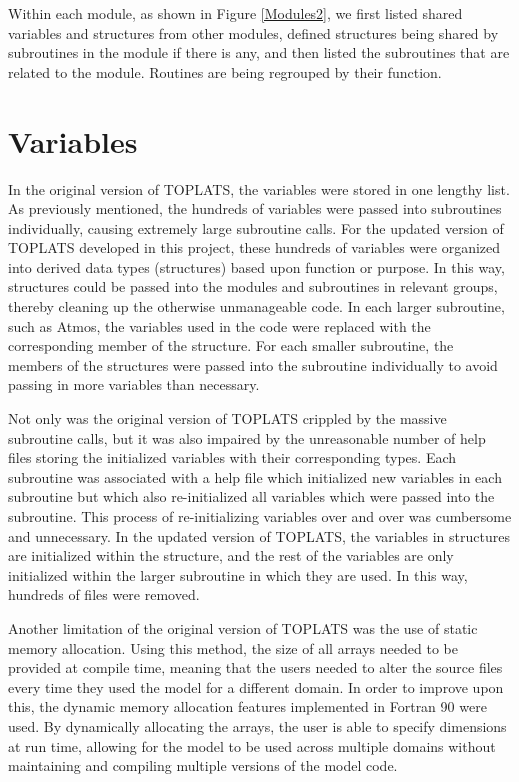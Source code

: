 \documentclass[pdftex,12pt,a4paper]{article}
\begin{document}
Within each module, as shown in Figure \ref{Modules2}, we first listed shared variables and structures from other modules, defined structures being shared by subroutines in the module if there is any, and then listed the subroutines that are related to the module. Routines are being regrouped by their function. 

\section{Variables}
In the original version of TOPLATS, the variables were stored in one lengthy list. As previously mentioned, the hundreds of variables were passed into subroutines individually, causing extremely large subroutine calls. For the updated version of TOPLATS developed in this project, these hundreds of variables were organized into derived data types (structures) based upon function or purpose. In this way, structures could be passed into the modules and subroutines in relevant groups, thereby cleaning up the otherwise unmanageable code. In each larger subroutine, such as Atmos, the variables used in the code were replaced with the corresponding member of the structure. For each smaller subroutine, the members of the structures were passed into the subroutine individually to avoid passing in more variables than necessary.

Not only was the original version of TOPLATS crippled by the massive subroutine calls, but it was also impaired by the unreasonable number of help files storing the initialized variables with their corresponding types. Each subroutine was associated with a help file which initialized new variables in each subroutine but which also re-initialized all variables which were passed into the subroutine. This process of re-initializing variables over and over was cumbersome and unnecessary. In the updated version of TOPLATS, the variables in structures are initialized within the structure, and the rest of the variables are only initialized within the larger subroutine in which they are used. In this way, hundreds of files were removed.

Another limitation of the original version of TOPLATS was the use of static memory allocation. Using this method, the size of all arrays needed to be provided at compile time, meaning that the users needed to alter the source files every time they used the model for a different domain. In order to improve upon this, the dynamic memory allocation features implemented in Fortran 90 were used. By dynamically allocating the arrays, the user is able to specify dimensions at run time, allowing for the model to be used across multiple domains without maintaining and compiling multiple versions of the model code.
\end{document}
